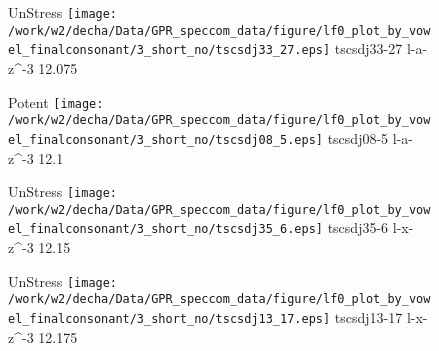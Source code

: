 \documentclass{article}
\begin{document}
\begin{figure}[t]
\begin{minipage}[b]{.24\textwidth}
UnStress
\centering
\texttt{[image: /work/w2/decha/Data/GPR\_speccom\_data/figure/lf0\_plot\_by\_vowel\_finalconsonant/3\_short\_no/tscsdj33\_27.eps]}
tscsdj33-27 l-a-z\textasciicircum-3 12.075
\end{minipage}
\begin{minipage}[b]{.24\textwidth}
\colorbox{Apricot}{Potent}
\centering
\texttt{[image: /work/w2/decha/Data/GPR\_speccom\_data/figure/lf0\_plot\_by\_vowel\_finalconsonant/3\_short\_no/tscsdj08\_5.eps]}
tscsdj08-5 l-a-z\textasciicircum-3 12.1
\end{minipage}
\begin{minipage}[b]{.24\textwidth}
UnStress
\centering
\texttt{[image: /work/w2/decha/Data/GPR\_speccom\_data/figure/lf0\_plot\_by\_vowel\_finalconsonant/3\_short\_no/tscsdj35\_6.eps]}
tscsdj35-6 l-x-z\textasciicircum-3 12.15
\end{minipage}
\begin{minipage}[b]{.24\textwidth}
UnStress
\centering
\texttt{[image: /work/w2/decha/Data/GPR\_speccom\_data/figure/lf0\_plot\_by\_vowel\_finalconsonant/3\_short\_no/tscsdj13\_17.eps]}
tscsdj13-17 l-x-z\textasciicircum-3 12.175
\end{minipage}
\end{figure}
\end{document}
